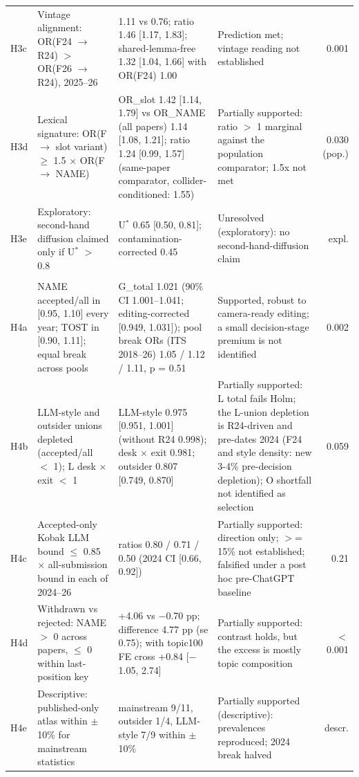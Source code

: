 \begin{table}[t]
\begin{tabular}{l p{3.4cm} p{5.0cm} p{3.6cm} r}
H3c & Vintage alignment: OR(F24 $\rightarrow$ R24) $>$ OR(F26 $\rightarrow$ R24), 2025--26 & 1.11 vs 0.76; ratio 1.46 [1.17, 1.83]; shared-lemma-free 1.32 [1.04, 1.66] with OR(F24) 1.00 & Prediction met; vintage reading not established & 0.001 \\
H3d & Lexical signature: OR(F $\rightarrow$ slot variant) $\geq$ 1.5 $\times$ OR(F $\rightarrow$ NAME) & OR\_slot 1.42 [1.14, 1.79] vs OR\_NAME (all papers) 1.14 [1.08, 1.21]; ratio 1.24 [0.99, 1.57] (same-paper comparator, collider-conditioned: 1.55) & Partially supported: ratio $>$ 1 marginal against the population comparator; 1.5x not met & 0.030 (pop.) \\
H3e & Exploratory: second-hand diffusion claimed only if U$^{*}$ $>$ 0.8 & U$^{*}$ 0.65 [0.50, 0.81]; contamination-corrected 0.45 & Unresolved (exploratory): no second-hand-diffusion claim & expl. \\
\addlinespace
\multicolumn{5}{l}{\textit{D4 The gatekeeper (2024--26 pooled)}} \\
H4a & NAME accepted/all in [0.95, 1.10] every year; TOST in [0.90, 1.11]; equal break across pools & G\_total 1.021 (90\% CI 1.001--1.041; editing-corrected [0.949, 1.031]); pool break ORs (ITS 2018--26) 1.05 / 1.12 / 1.11, p = 0.51 & Supported, robust to camera-ready editing; a small decision-stage premium is not identified & 0.002 \\
H4b & LLM-style and outsider unions depleted (accepted/all $<$ 1); L desk $\times$ exit $<$ 1 & LLM-style 0.975 [0.951, 1.001] (without R24 0.998); desk $\times$ exit 0.981; outsider 0.807 [0.749, 0.870] & Partially supported: L total fails Holm; the L-union depletion is R24-driven and pre-dates 2024 (F24 and style density: new 3-4\% pre-decision depletion); O shortfall not identified as selection & 0.059 \\
H4c & Accepted-only Kobak LLM bound $\leq$ 0.85 $\times$ all-submission bound in each of 2024--26 & ratios 0.80 / 0.71 / 0.50 (2024 CI [0.66, 0.92]) & Partially supported: direction only; $>$= 15\% not established; falsified under a post hoc pre-ChatGPT baseline & 0.21 \\
H4d & Withdrawn vs rejected: NAME $>$ 0 across papers, $\leq$ 0 within last-position key & +4.06 vs $-$0.70 pp; difference 4.77 pp (se 0.75); with topic100 FE cross +0.84 [$-$1.05, 2.74] & Partially supported: contrast holds, but the excess is mostly topic composition & $<$0.001 \\
H4e & Descriptive: published-only atlas within $\pm$10\% for mainstream statistics & mainstream 9/11, outsider 1/4, LLM-style 7/9 within $\pm$10\% & Partially supported (descriptive): prevalences reproduced; 2024 break halved & descr. \\

\end{tabular}
\end{table}
